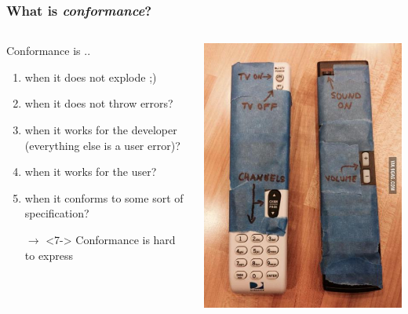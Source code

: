 \documentclass{beamer}
\begin{document}
\begin{frame}
\frametitle{What is \textit{conformance}?}
    \begin{columns}[c] %
    	\begin{block}{Conformance is ..}
        \begin{enumerate}[(1)]
          \item<2-> when it does not explode ;) 
          \item<3-> when it does not throw errors?
          \item<4-> when it works for the developer (everything else is a user
          error)?
          \item<5-> when it works for the user?
          \item<6-> when it conforms to some sort of specification?
          \item[$\xrightarrow{\ }$]<7-> Conformance is hard to express
        \end{enumerate}
        \end{block}
            \includegraphics[width=\textwidth]{../img/perfect_remote_control}
    \end{columns}
\end{frame}
\end{document}
